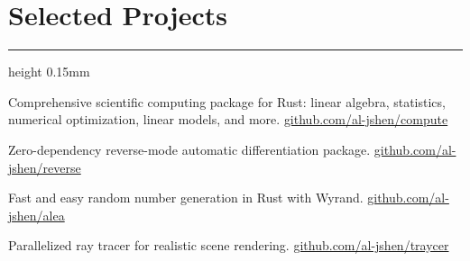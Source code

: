 \documentclass[11pt]{extarticle}
\newcommand{\hrulesp}[1]{%
  \vspace{-1.5mm}
  \hrule height 0.15mm
  \vspace{#1}
}
\begin{document}


\vspace{-4mm}
\section*{Selected Projects}
\hrulesp{2mm}

\begin{etaremune}
\item Comprehensive scientific computing package for Rust: linear algebra, statistics, numerical optimization, linear models, and more. \url{github.com/al-jshen/compute} 
\item Zero-dependency reverse-mode automatic differentiation package. \url{github.com/al-jshen/reverse} 
\item Fast and easy random number generation in Rust with Wyrand. \url{github.com/al-jshen/alea} 
\item Parallelized ray tracer for realistic scene rendering. \url{github.com/al-jshen/traycer} 
\end{etaremune}
\end{document}
